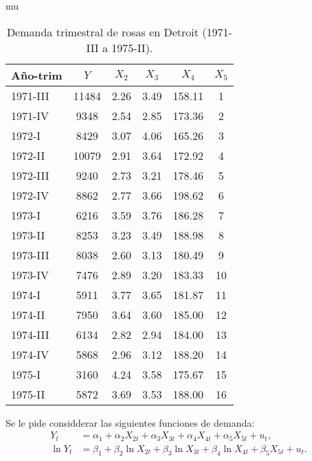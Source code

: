 mu\documentclass[10pt]{article}
\begin{document}
\begin{table}[H]
    \centering
    \begin{tabular}{lccccc}
        \hline
        \textbf{Año-trim} & $Y$ & $X_2$ & $X_3$ & $X_4$ & $X_5$ \\
        \hline
        1971-III & 11484 & 2.26 & 3.49 & 158.11 & 1 \\
        1971-IV  &  9348 & 2.54 & 2.85 & 173.36 & 2 \\
        1972-I   &  8429 & 3.07 & 4.06 & 165.26 & 3 \\
        1972-II  & 10079 & 2.91 & 3.64 & 172.92 & 4 \\
        1972-III &  9240 & 2.73 & 3.21 & 178.46 & 5 \\
        1972-IV  &  8862 & 2.77 & 3.66 & 198.62 & 6 \\
        1973-I   &  6216 & 3.59 & 3.76 & 186.28 & 7 \\
        1973-II  &  8253 & 3.23 & 3.49 & 188.98 & 8 \\
        1973-III &  8038 & 2.60 & 3.13 & 180.49 & 9 \\
        1973-IV  &  7476 & 2.89 & 3.20 & 183.33 & 10 \\
        1974-I   &  5911 & 3.77 & 3.65 & 181.87 & 11 \\
        1974-II  &  7950 & 3.64 & 3.60 & 185.00 & 12 \\
        1974-III &  6134 & 2.82 & 2.94 & 184.00 & 13 \\
        1974-IV  &  5868 & 2.96 & 3.12 & 188.20 & 14 \\
        1975-I   &  3160 & 4.24 & 3.58 & 175.67 & 15 \\
        1975-II  &  5872 & 3.69 & 3.53 & 188.00 & 16 \\
        \hline
    \end{tabular}
    \caption{Demanda trimestral de rosas en Detroit (1971-III a 1975-II).}
    \label{tab:demanda_rosas}
\end{table}

Se le pide considderar las siguientes funciones de demanda:
\begin{align*}
    Y_t &= \alpha_1 + \alpha_2 X_{2t} + \alpha_3 X_{3t} + \alpha_4 X_{4t} + \alpha_5 X_{5t} + u_t, \\
    \ln Y_t &= \beta_1 + \beta_2 \ln X_{2t} + \beta_3 \ln X_{3t} + \beta_4 \ln X_{4t} + \beta_5 X_{5t} + u_t.
\end{align*}
\end{document}
